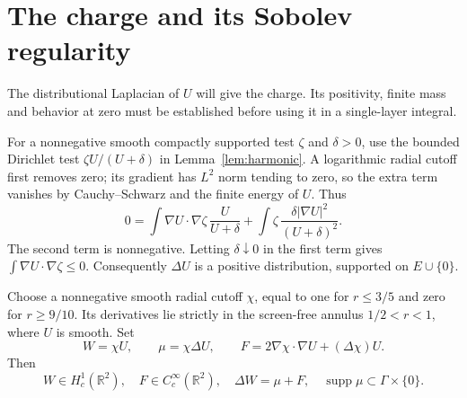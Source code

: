 \documentclass[11pt]{article}
\newcommand{\R}{\mathbb R}
\newcommand{\supp}{\operatorname{supp}}
\begin{document}
\section{The charge and its Sobolev regularity}\label{sec:charge}

The distributional Laplacian of \(U\) will give the charge. Its positivity,
finite mass and behavior at zero must be established before using it in a
single-layer integral.

For a nonnegative smooth compactly supported test \(\zeta\) and
\(\delta>0\), use the bounded Dirichlet test
\(\zeta U/(U+\delta)\) in Lemma~\ref{lem:harmonic}. A logarithmic radial
cutoff first removes zero; its gradient has \(L^2\) norm tending to zero,
so the extra term vanishes by Cauchy--Schwarz and the finite energy of
\(U\). Thus
\[
 0=\int\nabla U\cdot\nabla\zeta\,\frac{U}{U+\delta}
    +\int\zeta\,\frac{\delta|\nabla U|^2}{(U+\delta)^2}.
\]
The second term is nonnegative. Letting \(\delta\downarrow0\) in the first
term gives \(\int\nabla U\cdot\nabla\zeta\le0\).
Consequently \(\Delta U\) is a positive distribution, supported on
\(E\cup\{0\}\).

Choose a nonnegative smooth radial cutoff \(\chi\), equal to one for
\(r\le3/5\) and zero for \(r\ge9/10\). Its derivatives lie strictly in
the screen-free annulus \(1/2<r<1\), where \(U\) is smooth. Set
\begin{equation}\label{eq:compact-charge}
 W=\chi U,\qquad \mu=\chi\Delta U,\qquad
 F=2\nabla\chi\cdot\nabla U+(\Delta\chi)U .
\end{equation}
Then
\begin{equation}\label{eq:laplacian}
 W\in H^1_c(\R^2),\quad F\in C^\infty_c(\R^2),\quad
 \Delta W=\mu+F,\quad \supp\mu\subset\Gamma\times\{0\}.
\end{equation}
\end{document}
